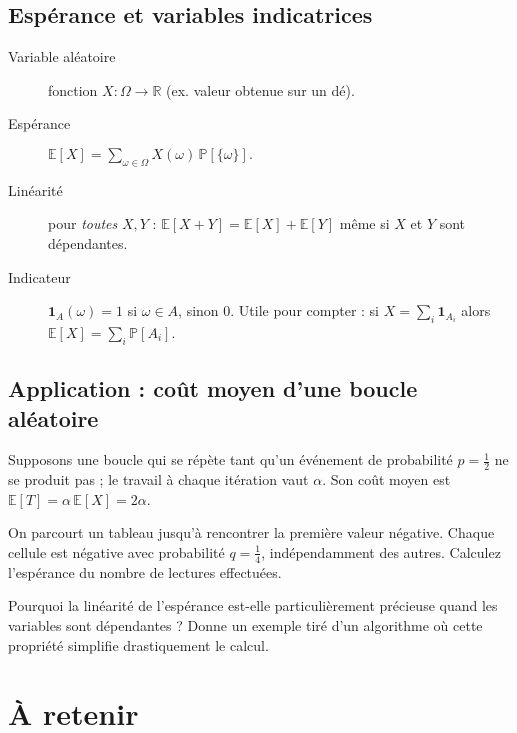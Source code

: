 \subsection{Espérance et variables indicatrices}
\begin{description}
  \item[Variable aléatoire] fonction $X:\Omega\to\mathbb{R}$ (ex. valeur
        obtenue sur un dé).
  \item[Espérance] \(\displaystyle \mathbb{E}[X]=\sum_{\omega\in\Omega}
        X(\omega)\,\mathbb{P}[\{\omega\}].\)
  \item[Linéarité] pour \emph{toutes} $X,Y$ :
        \(\mathbb{E}[X+Y]=\mathbb{E}[X]+\mathbb{E}[Y]\) même si $X$ et $Y$
        sont dépendantes.
  \item[Indicateur] \(\mathbf{1}_{A}(\omega)=1\) si $\omega\in A$, sinon 0.
        Utile pour compter : si $X=\sum_i \mathbf{1}_{A_i}$ alors
        \(\mathbb{E}[X]=\sum_i \mathbb{P}[A_i]\).
\end{description}


\subsection{Application : coût moyen d’une boucle aléatoire}
Supposons une boucle qui se répète tant qu’un événement de probabilité
\(p=\tfrac12\) ne se produit pas ; le travail à chaque itération vaut
\(\alpha\).  Son coût moyen est
\(\mathbb{E}[T]=\alpha\,\mathbb{E}[X]=2\alpha\).

\begin{exercice}
On parcourt un tableau jusqu’à rencontrer la première valeur négative.
Chaque cellule est négative avec probabilité $q=\tfrac14$, indépendamment
des autres.  Calculez l’espérance du nombre de lectures effectuées.
\end{exercice}

\begin{reflexion}
Pourquoi la linéarité de l’espérance est-elle particulièrement précieuse
quand les variables sont dépendantes ?  Donne un exemple tiré d’un
algorithme où cette propriété simplifie drastiquement le calcul.
\end{reflexion}

\section*{À retenir}

